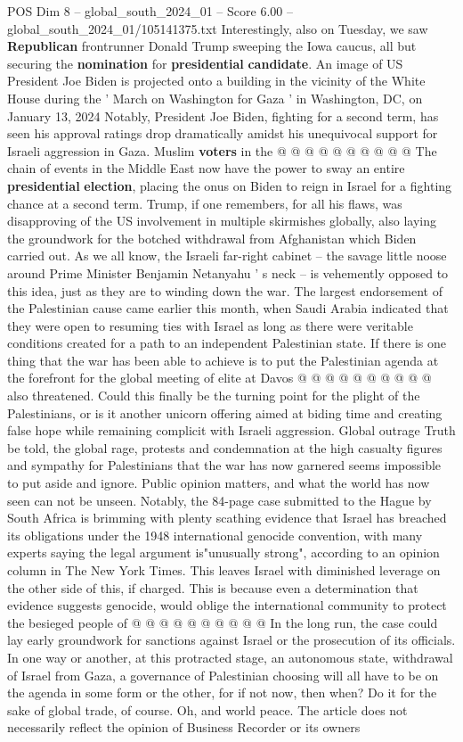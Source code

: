 \begin{textsample}{POS Dim 8 – global\_south\_2024\_01 – Score 6.00 – global\_south\_2024\_01/105141375.txt}
Interestingly, also on Tuesday, we saw \textbf{Republican} frontrunner Donald Trump sweeping the Iowa caucus, all but securing the \textbf{nomination} for \textbf{presidential} \textbf{candidate}.
An image of US President Joe Biden is projected onto a building in the vicinity of the White House during the ' March on Washington for Gaza ' in Washington, DC, on January 13, 2024 Notably, President Joe Biden, fighting for a second term, has seen his approval ratings drop dramatically amidst his unequivocal support for Israeli aggression in Gaza.
Muslim \textbf{voters} in the @ @ @ @ @ @ @ @ @ @ The chain of events in the Middle East now have the power to sway an entire \textbf{presidential} \textbf{election}, placing the onus on Biden to reign in Israel for a fighting chance at a second term.
Trump, if one remembers, for all his flaws, was disapproving of the US involvement in multiple skirmishes globally, also laying the groundwork for the botched withdrawal from Afghanistan which Biden carried out.
As we all know, the Israeli far-right cabinet -- the savage little noose around Prime Minister Benjamin Netanyahu ' s neck -- is vehemently opposed to this idea, just as they are to winding down the war.
The largest endorsement of the Palestinian cause came earlier this month, when Saudi Arabia indicated that they were open to resuming ties with Israel as long as there were veritable conditions created for a path to an independent Palestinian state.
If there is one thing that the war has been able to achieve is to put the Palestinian agenda at the forefront for the global meeting of elite at Davos @ @ @ @ @ @ @ @ @ @ also threatened.
Could this finally be the turning point for the plight of the Palestinians, or is it another unicorn offering aimed at biding time and creating false hope while remaining complicit with Israeli aggression.
Global outrage Truth be told, the global rage, protests and condemnation at the high casualty figures and sympathy for Palestinians that the war has now garnered seems impossible to put aside and ignore.
Public opinion matters, and what the world has now seen can not be unseen.
Notably, the 84-page case submitted to the Hague by South Africa is brimming with plenty scathing evidence that Israel has breached its obligations under the 1948 international genocide convention, with many experts saying the legal argument is"unusually strong", according to an opinion column in The New York Times.
This leaves Israel with diminished leverage on the other side of this, if charged.
This is because even a determination that evidence suggests genocide, would oblige the international community to protect the besieged people of @ @ @ @ @ @ @ @ @ @ In the long run, the case could lay early groundwork for sanctions against Israel or the prosecution of its officials.
In one way or another, at this protracted stage, an autonomous state, withdrawal of Israel from Gaza, a governance of Palestinian choosing will all have to be on the agenda in some form or the other, for if not now, then when?
Do it for the sake of global trade, of course.
Oh, and world peace.
The article does not necessarily reflect the opinion of Business Recorder or its owners


\end{textsample}

